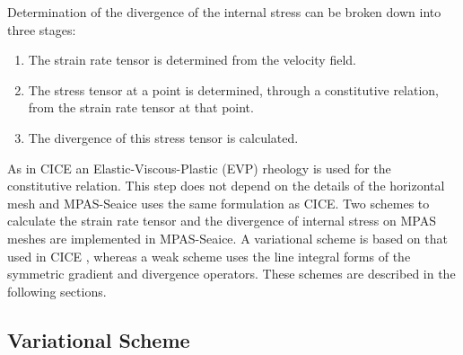 Determination of the divergence of the internal stress can be broken down into three stages: 
\begin{enumerate}
\item The strain rate tensor is determined from the velocity field.
\item The stress tensor at a point is determined, through a constitutive relation, from the strain rate tensor at that point.
\item The divergence of this stress tensor is calculated. 
\end{enumerate}
As in CICE an Elastic-Viscous-Plastic (EVP) rheology \citep{Hunke97} is used for the constitutive relation. This step does not depend on the details of the horizontal mesh and MPAS-Seaice uses the same formulation as CICE. Two schemes to calculate the strain rate tensor and the divergence of internal stress on MPAS meshes are implemented in MPAS-Seaice. A variational scheme is based on that used in CICE \citep{Hunke02}, whereas a weak scheme uses the line integral forms of the symmetric gradient and divergence operators. These schemes are described in the following sections.

\subsection{Variational Scheme}

